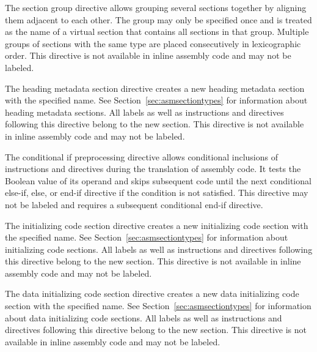 
The section group directive allows grouping several sections together by aligning them adjacent to each other.
The group may only be specified once and is treated as the name of a virtual section that contains all sections in that group.
Multiple groups of sections with the same type are placed consecutively in lexicographic order.
This directive is not available in inline assembly code and may not be labeled.


The heading metadata section directive creates a new heading metadata section with the specified name.
See Section~\ref{sec:asmsectiontypes} for information about heading metadata sections.
All labels as well as instructions and directives following this directive belong to the new section.
This directive is not available in inline assembly code and may not be labeled.


The conditional if preprocessing directive allows conditional inclusions of instructions and directives during the translation of assembly code.
It tests the Boolean value of its operand and skips subsequent code until the next conditional else-if, else, or end-if directive if the condition is not satisfied.
This directive may not be labeled and requires a subsequent conditional end-if directive.


The initializing code section directive creates a new initializing code section with the specified name.
See Section~\ref{sec:asmsectiontypes} for information about initializing code sections.
All labels as well as instructions and directives following this directive belong to the new section.
This directive is not available in inline assembly code and may not be labeled.


The data initializing code section directive creates a new data initializing code section with the specified name.
See Section~\ref{sec:asmsectiontypes} for information about data initializing code sections.
All labels as well as instructions and directives following this directive belong to the new section.
This directive is not available in inline assembly code and may not be labeled.

